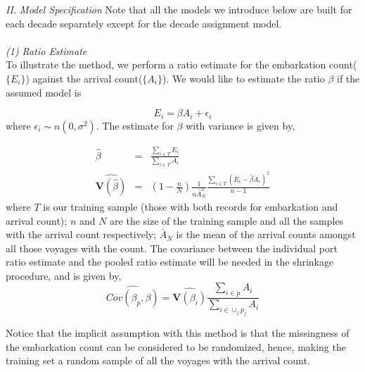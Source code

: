\documentclass{article}
\begin{document}
\begin{table}
\end{table}

\textit{II. Model Specification}
\indent
Note that all the models we introduce below are built for each decade separately except for the 
decade assignment model.\\
\\
\textit{(1) Ratio Estimate}\\
\indent
To illustrate the method, we perform a ratio estimate for the
embarkation count($\{E_i\}$) against the arrival count($\{A_i\}$).  We would
like to estimate the ratio $\beta$ if the assumed model is

\begin{equation}
E_i = \beta A_i + \epsilon_i
\end{equation}
where $\epsilon_i \sim n(0,\sigma^2)$.  The estimate for $\beta$ with
variance is given by,

\begin{eqnarray}
\hat{\beta} &=& \frac{\sum_{i \in T} E_i}{\sum_{i \in T} A_i}\\
\widehat{\mathbf{V}(\hat{\beta})} &=& (1 - \frac{n}{N})\frac{1}{n
  \bar{A}_N^2}\frac{\sum_{i \in T} (E_i - \hat{\beta} A_i)^2}{n - 1}
\end{eqnarray} 
where $T$ is our training sample (those with both records for
embarkation and arrival count); $n$ and $N$ are the size of the
training sample and all the samples with the arrival count
respectively; $\bar{A}_N$ is the mean of the arrival counts amongst
all those voyages with the count.
The covariance between the individual port ratio estimate and the pooled ratio estimate will be needed in the shrinkage procedure, and is given by,
\begin{equation}
\widehat{Cov(\beta_{p},\beta)} = \widehat{\mathbf{V}(\beta_i)} \frac{\sum_{i \in p} A_i}{\sum_{i \in \cup_j p_j} A_i}
\end{equation}
\par
Notice that the implicit assumption with this method is that the
missingness of the embarkation count can be considered to be randomized, 
hence, making the training set a random sample of all the
voyages with the arrival count.\\
\end{document}
